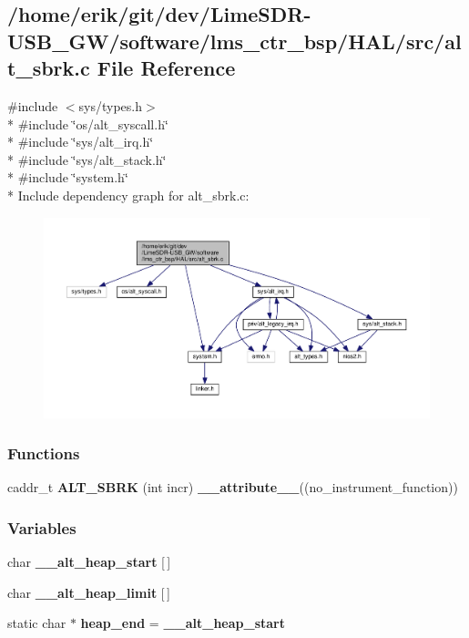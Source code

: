 \subsection{/home/erik/git/dev/\+Lime\+S\+D\+R-\/\+U\+S\+B\+\_\+\+G\+W/software/lms\+\_\+ctr\+\_\+bsp/\+H\+A\+L/src/alt\+\_\+sbrk.c File Reference}
\label{alt__sbrk_8c}
{\ttfamily \#include $<$sys/types.\+h$>$}\\*
{\ttfamily \#include \char`\"{}os/alt\+\_\+syscall.\+h\char`\"{}}\\*
{\ttfamily \#include \char`\"{}sys/alt\+\_\+irq.\+h\char`\"{}}\\*
{\ttfamily \#include \char`\"{}sys/alt\+\_\+stack.\+h\char`\"{}}\\*
{\ttfamily \#include \char`\"{}system.\+h\char`\"{}}\\*
Include dependency graph for alt\+\_\+sbrk.\+c\+:
\nopagebreak
\begin{figure}[H]
\begin{center}
\leavevmode
\includegraphics[width=350pt]{d0/d87/alt__sbrk_8c__incl}
\end{center}
\end{figure}
\subsubsection*{Functions}
\begin{DoxyCompactItemize}
\item 
caddr\+\_\+t {\bf A\+L\+T\+\_\+\+S\+B\+RK} (int incr) {\bf \+\_\+\+\_\+attribute\+\_\+\+\_\+}((no\+\_\+instrument\+\_\+function))
\end{DoxyCompactItemize}
\subsubsection*{Variables}
\begin{DoxyCompactItemize}
\item 
char {\bf \+\_\+\+\_\+alt\+\_\+heap\+\_\+start} [$\,$]
\item 
char {\bf \+\_\+\+\_\+alt\+\_\+heap\+\_\+limit} [$\,$]
\item 
static char $\ast$ {\bf heap\+\_\+end} = {\bf \+\_\+\+\_\+alt\+\_\+heap\+\_\+start}
\end{DoxyCompactItemize}


